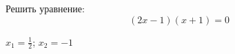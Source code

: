 \begin{ex}
	Решить уравнение:
	$$ (2x-1)(x+1)=0 $$
	\begin{answer}
		$x_1=\frac{1}{2}$; $x_2=-1$
	\end{answer}
\end{ex}